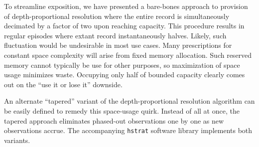 To streamline exposition, we have presented a bare-bones approach to provision of depth-proportional resolution where the entire record is simultaneously decimated by a factor of two upon reaching capacity.
This procedure results in regular episodes where extant record instantaneously halves.
Likely, such fluctuation would be undesirable in most use cases.
Many prescriptions for constant space complexity will arise from fixed memory allocation.
Such reserved memory cannot typically be use for other purposes, so maximization of space usage minimizes waste.
Occupying only half of bounded capacity clearly comes out on the ``use it or lose it'' downside.

An alternate ``tapered'' variant of the depth-proportional resolution algorithm can be easily defined to remedy this space-usage quirk.
Instead of all at once, the tapered approach eliminates phased-out observations one by one as new observations accrue.
The accompanying \texttt{hstrat} software library implements both variants.



% 
% 
